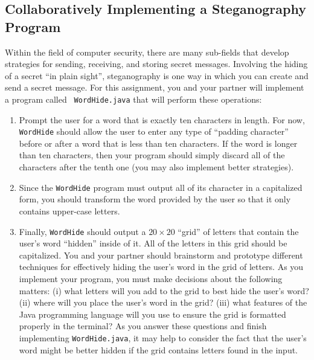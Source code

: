\vspace{-0.1in}
\subsection*{Collaboratively Implementing a Steganography Program}
\vspace{-0.05in}

Within the field of computer security, there are many sub-fields that develop strategies for sending, receiving, and
storing secret messages.  Involving the hiding of a secret ``in plain sight'', steganography is one way in which you can
create and send a secret message. For this assignment, you and your partner will implement a program called {\tt
WordHide.java} that will perform these operations:

\begin{enumerate}

  \item Prompt the user for a word that is exactly ten characters in length. For now, {\tt WordHide} should allow the
    user to enter any type of ``padding character'' before or after a word that is less than ten characters. If the word
    is longer than ten characters, then your program should simply discard all of the characters after the tenth one
    (you may also implement better strategies).

  \item Since the {\tt WordHide} program must output all of its character in a capitalized form, you should transform the
    word provided by the user so that it only contains upper-case letters.

  \item Finally, {\tt WordHide} should output a $20 \times 20$ ``grid'' of letters that contain the user's word
    ``hidden'' inside of it. All of the letters in this grid should be capitalized. You and your partner should
    brainstorm and prototype different techniques for effectively hiding the user's word in the grid of letters. As you
    implement your program, you must make decisions about the following matters: (i) what letters will you add to the
    grid to best hide the user's word? (ii) where will you place the user's word in the grid? (iii) what features of the
    Java programming language will you use to ensure the grid is formatted properly in the terminal? As you answer these
    questions and finish implementing {\tt WordHide.java}, it may help to consider the fact that the user's word might be
    better hidden if the grid contains letters found in the input.

\end{enumerate}


